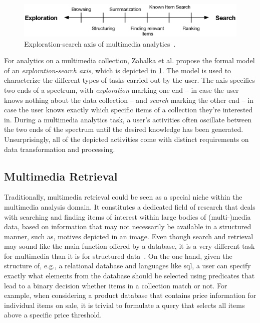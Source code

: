 \begin{figure}[h]
    \centering
    \includegraphics[width=\textwidth]{figures/exploration_search_axis.eps}
    \caption{Exploration-search axis of multimedia analytics~\cite{Zahalka:2014towards}.}
    \label{figure:exploration-search-axis}
\end{figure}

For analytics on a multimedia collection, Zahalka et al. \cite{Zahalka:2014towards} propose the formal model of an \emph{exploration-search axis}, which is depicted in \cref{figure:exploration-search-axis}. The model is used to characterize the different types of tasks carried out by the user. The axis specifies two ends of a spectrum, with \emph{exploration} marking one end -- in case the user knows nothing about the data collection -- and \emph{search} marking the other end -- in case the user knows exactly which specific items of a collection they're interested in. During a multimedia analytics task, a user's activities often oscillate between the two ends of the spectrum until the desired knowledge has been generated. Unsurprisingly, all of the depicted activities come with distinct requirements on data transformation and processing.

\subsection{Multimedia Retrieval}

Traditionally, multimedia retrieval could be seen as a special niche within the  multimedia analysis domain. It constitutes a dedicated field of research that deals with searching and finding items of interest within large bodies of (multi-)media data, based on information that may not necessarily be available in a structured manner, such as, motives depicted in an image. Even though search and retrieval may sound like the main function offered by a database, it is a very different task for multimedia than it is for structured data~\cite{Blanken:2007multimedia}. On the one hand, given the structure of, e.g., a relational database and languages like \acrshort{sql}, a user can specify exactly what elements from the database should be selected using predicates that lead to a binary decision whether items in a collection match or not. For example, when considering a product database that contains price information for individual items on sale, it is trivial to formulate a query that selects all items above a specific price threshold.

